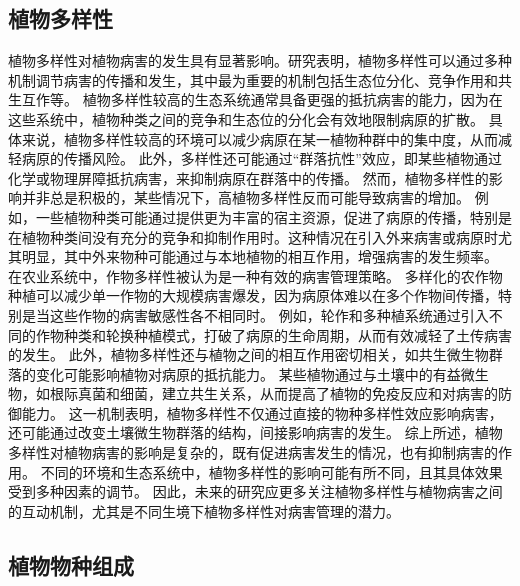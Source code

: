 \documentclass[AutoFakeBold]{LZUThesis-PgD&PhD}
\begin{document}
\subsection{植物多样性}
植物多样性对植物病害的发生具有显著影响。研究表明，植物多样性可以通过多种机制调节病害的传播和发生，其中最为重要的机制包括生态位分化、竞争作用和共生互作等。
植物多样性较高的生态系统通常具备更强的抵抗病害的能力，因为在这些系统中，植物种类之间的竞争和生态位的分化会有效地限制病原的扩散。
具体来说，植物多样性较高的环境可以减少病原在某一植物种群中的集中度，从而减轻病原的传播风险\cite{Mitchell2002}。
此外，多样性还可能通过“群落抗性”效应，即某些植物通过化学或物理屏障抵抗病害，来抑制病原在群落中的传播。
然而，植物多样性的影响并非总是积极的，某些情况下，高植物多样性反而可能导致病害的增加。
例如，一些植物种类可能通过提供更为丰富的宿主资源，促进了病原的传播，特别是在植物种类间没有充分的竞争和抑制作用时。这种情况在引入外来病害或病原时尤其明显，其中外来物种可能通过与本地植物的相互作用，增强病害的发生频率\cite{Garrett2006}。
在农业系统中，作物多样性被认为是一种有效的病害管理策略。
多样化的农作物种植可以减少单一作物的大规模病害爆发，因为病原体难以在多个作物间传播，特别是当这些作物的病害敏感性各不相同时\cite{Pautasso2010}。
例如，轮作和多种植系统通过引入不同的作物种类和轮换种植模式，打破了病原的生命周期，从而有效减轻了土传病害的发生。
此外，植物多样性还与植物之间的相互作用密切相关，如共生微生物群落的变化可能影响植物对病原的抵抗能力。
某些植物通过与土壤中的有益微生物，如根际真菌和细菌，建立共生关系，从而提高了植物的免疫反应和对病害的防御能力\cite{Bever2010}。
这一机制表明，植物多样性不仅通过直接的物种多样性效应影响病害，还可能通过改变土壤微生物群落的结构，间接影响病害的发生。
综上所述，植物多样性对植物病害的影响是复杂的，既有促进病害发生的情况，也有抑制病害的作用。
不同的环境和生态系统中，植物多样性的影响可能有所不同，且其具体效果受到多种因素的调节。
因此，未来的研究应更多关注植物多样性与植物病害之间的互动机制，尤其是不同生境下植物多样性对病害管理的潜力\cite{Allison2008,Maron2011}。

\subsection{植物物种组成}
\end{document}
